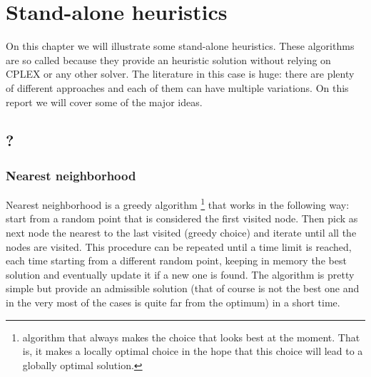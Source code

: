 \chapter{Stand-alone heuristics}
On this chapter we will illustrate some stand-alone heuristics. These algorithms are so called because they provide an heuristic solution without relying on CPLEX or any other solver. The literature in this case is huge: there are plenty of different approaches and each of them can have multiple variations. On this report we will cover some of the major ideas. 

\section{?}
\subsection{Nearest neighborhood}
Nearest neighborhood is a greedy algorithm \footnote{algorithm that always makes the choice that looks best at the moment. That is, it makes a locally optimal choice in the hope that this choice
will lead to a globally optimal solution.  %
} that works in the following way: start from a random point that is considered the first visited node. Then pick as next node the nearest to the last visited (greedy choice) and iterate until all the nodes are visited. This procedure can be repeated until a time limit is reached, each time starting from a different random point, keeping in memory the best solution and eventually update it if a new one is found. The algorithm is pretty simple but provide an admissible solution (that of course is not the best one and in the very most of the cases is quite far from the optimum) in a short time. \\

